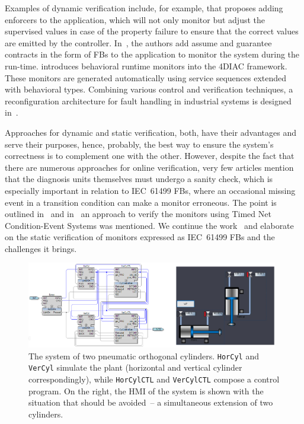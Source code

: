 \begin{bibunit}
Examples of dynamic verification include, for example, \cite{1falcone2022runtime} that proposes adding enforcers to the application, which will not only monitor but adjust the supervised values in case of the property failure to ensure that the correct values are emitted by the controller. In~\cite{3do2020towards, 8ng2019contract}, the authors add assume and guarantee contracts in the form of FBs to the application to monitor the system during the run-time. \cite{4wenger15behavior} introduces behavioral runtime monitors into the 4DIAC framework. These monitors are generated automatically using service sequences extended with behavioral types. Combining various control and verification techniques, a reconfiguration architecture for fault handling in industrial systems is designed in~\cite{10leitao2020fault}. 


Approaches for dynamic and static verification, both, have their advantages and serve their purposes, hence, probably, the best way to ensure the system's correctness is to complement one with the other. However, despite the fact that there are numerous approaches for online verification, very few articles mention that the diagnosis units themselves must undergo a sanity check, which is especially important in relation to IEC~61499 FBs, where an occasional missing event in a transition condition can make a monitor erroneous. The point is outlined in~\cite{9wiesmayr2022supporting} and in~\cite{17jhunjhunwala2022monitoring} an approach to verify the monitors using Timed Net Condition-Event Systems was mentioned. We continue the work~\cite{17jhunjhunwala2022monitoring} and elaborate on the static verification of monitors expressed as IEC~61499 FBs and the challenges it brings. 
 
\begin{figure}[htb]
    \centering
    \includegraphics[width=0.98\textwidth]{MX_Papers/Paper3/pic/wholesystem_withhmi.png}
    \caption{The system of two pneumatic orthogonal cylinders. \texttt{HorCyl} and \texttt{VerCyl} simulate the plant (horizontal and vertical cylinder correspondingly), while \texttt{HorCylCTL} and \texttt{VerCylCTL} compose a control program. On the right, the HMI of the system is shown with the situation that should be avoided~-- a simultaneous extension of two cylinders.}
    \label{system}
\end{figure}


\end{bibunit}
